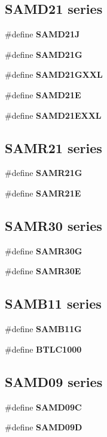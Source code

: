 \subsection*{S\+A\+M\+D21 series}
\begin{DoxyCompactItemize}
\item 
\#define {\bfseries S\+A\+M\+D21\+J}
\item 
\#define {\bfseries S\+A\+M\+D21\+G}
\item 
\#define {\bfseries S\+A\+M\+D21\+G\+X\+X\+L}
\item 
\#define {\bfseries S\+A\+M\+D21\+E}
\item 
\#define {\bfseries S\+A\+M\+D21\+E\+X\+X\+L}
\end{DoxyCompactItemize}
\subsection*{S\+A\+M\+R21 series}
\begin{DoxyCompactItemize}
\item 
\#define {\bfseries S\+A\+M\+R21\+G}
\item 
\#define {\bfseries S\+A\+M\+R21\+E}
\end{DoxyCompactItemize}
\subsection*{S\+A\+M\+R30 series}
\begin{DoxyCompactItemize}
\item 
\#define {\bfseries S\+A\+M\+R30\+G}
\item 
\#define {\bfseries S\+A\+M\+R30\+E}
\end{DoxyCompactItemize}
\subsection*{S\+A\+M\+B11 series}
\begin{DoxyCompactItemize}
\item 
\#define {\bfseries S\+A\+M\+B11\+G}
\item 
\#define {\bfseries B\+T\+L\+C1000}
\end{DoxyCompactItemize}
\subsection*{S\+A\+M\+D09 series}
\begin{DoxyCompactItemize}
\item 
\#define {\bfseries S\+A\+M\+D09\+C}
\item 
\#define {\bfseries S\+A\+M\+D09\+D}
\end{DoxyCompactItemize}
